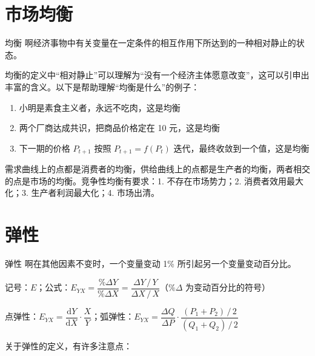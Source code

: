 \section{市场均衡}

\begin{definition}{均衡}
    啊经济事物中有关变量在一定条件的相互作用下所达到的一种相对静止的状态。
\end{definition}

均衡的定义中“相对静止”可以理解为“没有一个经济主体愿意改变”，这可以引申出丰富的含义。以下是帮助理解“均衡是什么”的例子：

\begin{enumerate}
    \item 小明是素食主义者，永远不吃肉，这是均衡
    \item 两个厂商达成共识，把商品价格定在 10 元，这是均衡
    \item 下一期的价格 $P_{t+1}$ 按照 $P_{t+1}=f\left(P_t\right)$ 迭代，最终收敛到一个值，这是均衡
\end{enumerate}

需求曲线上的点都是消费者的均衡，供给曲线上的点都是生产者的均衡，两者相交的点是市场的均衡。竞争性均衡有要求：1. 不存在市场势力；2. 消费者效用最大化；3. 生产者利润最大化；4. 市场出清。

\section{弹性}

\begin{definition}{弹性}
    啊在其他因素不变时，一个变量变动 1\% 所引起另一个变量变动百分比。
    \vspace{0.5em}
    
    记号：$E$；公式：$E_{YX}=\dfrac{\%\Delta Y}{\%\Delta X}=\dfrac{\Delta Y\,/\,Y}{\Delta X\,/\,X}$（$\%\Delta$ 为变动百分比的符号）
    \vspace{0.5em}
    
    点弹性：$E_{YX}=\dfrac{\mathrm dY}{\mathrm dX}\cdot\dfrac XY$；\quad\quad 弧弹性：$E_{YX}=\dfrac{\Delta Q}{\Delta P}\cdot\dfrac{\left(P_1+P_2\right)\,/\,2}{\left(Q_1+Q_2\right)\,/\,2}$
\end{definition}

关于弹性的定义，有许多注意点：

